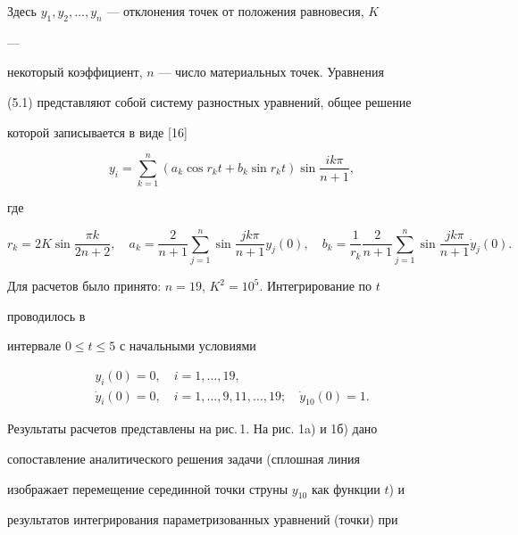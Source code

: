  


Здесь $y_1,y_2,\dotsc,y_n$ --- отклонения точек от положения равновесия, $K$ 


--- 


некоторый коэффициент, $n$ --- число материальных точек. Уравнения 


(5.1) представляют собой систему разностных уравнений, общее решение 


которой записывается в виде [16] 


$$ 


y_i=\sum^n_{k=1}(a_k\cos r_k t+b_k\sin r_k t)\sin\frac{ik\pi}{n+1}, 


$$ 


где 


$$ 


r_k=2K\sin\frac{\pi k}{2n+2},\quad a_k=\frac{2}{n+1}\sum^n_{j=1} 


\sin\frac{j k\pi}{n+1}y_j(0),\quad b_k=\frac{1}{r_k} 


\frac{2}{n+1}\sum^n_{j=1}\sin\frac{j k\pi}{n+1}\Dot y_j(0). 


$$ 


Для расчетов было принято: $n=19$, $K^2=10^5$. Интегрирование по $t$ 


проводилось в 


интервале $0\le t\le 5$ с начальными условиями 


\begin{equation} 


\begin{array}{c} 


y_i(0)=0,\quad i=1,\dotsc,19,\\[2mm] 


\Dot y_i(0)=0,\quad i=1,\dotsc,9,11,\dotsc,19;\quad 


\Dot y_{10}(0)=1. 


\end{array}


\end{equation} 


 


Результаты расчетов представлены на рис.\,1. На рис. 1a) и 1б) дано 


сопоставление аналитического решения задачи (сплошная линия 


изображает перемещение серединной точки струны $y_{10}$ как функции $t$) и 


результатов интегрирования параметризованных уравнений (точки) при 


